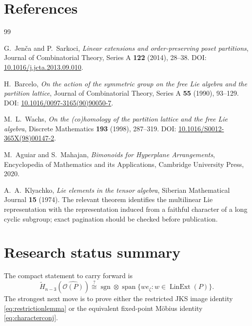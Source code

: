 \documentclass[11pt]{article}
\newcommand{\OP}{\mathcal O}
\newcommand{\Lin}{\operatorname{LinExt}}
\newcommand{\sgn}{\operatorname{sgn}}
\begin{document}
\section{References}
\begin{thebibliography}{99}

G.~Jen\v{c}a and P.~Sarkoci,
\emph{Linear extensions and order-preserving poset partitions},
Journal of Combinatorial Theory, Series A \textbf{122} (2014), 28--38.
DOI: \href{https://doi.org/10.1016/j.jcta.2013.09.010}
{10.1016/j.jcta.2013.09.010}.

H.~Barcelo,
\emph{On the action of the symmetric group on the free Lie algebra and the
partition lattice},
Journal of Combinatorial Theory, Series A \textbf{55} (1990), 93--129.
DOI: \href{https://doi.org/10.1016/0097-3165(90)90050-7}
{10.1016/0097-3165(90)90050-7}.

M.~L.~Wachs,
\emph{On the (co)homology of the partition lattice and the free Lie algebra},
Discrete Mathematics \textbf{193} (1998), 287--319.
DOI: \href{https://doi.org/10.1016/S0012-365X(98)00147-2}
{10.1016/S0012-365X(98)00147-2}.

M.~Aguiar and S.~Mahajan,
\emph{Bimonoids for Hyperplane Arrangements},
Encyclopedia of Mathematics and its Applications, Cambridge University
Press, 2020.

A.~A.~Klyachko,
\emph{Lie elements in the tensor algebra},
Siberian Mathematical Journal \textbf{15} (1974).
The relevant theorem identifies the multilinear Lie representation with the
representation induced from a faithful character of a long cyclic subgroup;
exact pagination should be checked before publication.

\end{thebibliography}

\section*{Research status summary}
The compact statement to carry forward is
\[
\boxed{
\widetilde H_{n-3}(\widehat{\OP(P)})
\stackrel{?}{\cong}
\sgn\otimes\operatorname{span}\{we_\zeta:w\in\Lin(P)\}.}
\]
The strongest next move is to prove either the restricted JKS image identity
\eqref{eq:restrictionlemma} or the equivalent fixed-point M\"obius identity
\eqref{eq:characterconj}.
\end{document}
